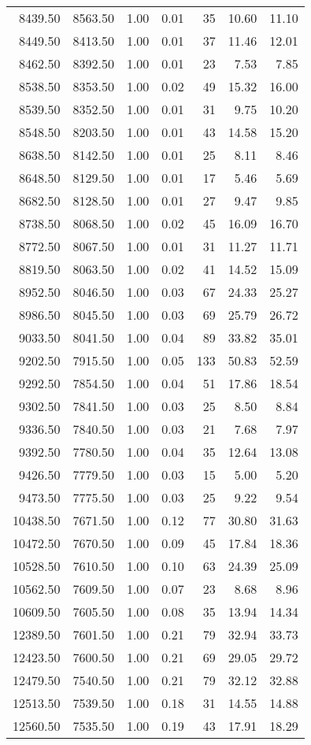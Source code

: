\begin{table}
\begin{tabular}{rrrrrrr}
8439.50 & 8563.50 & 1.00 & 0.01 & 35 & 10.60 & 11.10 \\
8449.50 & 8413.50 & 1.00 & 0.01 & 37 & 11.46 & 12.01 \\
8462.50 & 8392.50 & 1.00 & 0.01 & 23 & 7.53 & 7.85 \\
8538.50 & 8353.50 & 1.00 & 0.02 & 49 & 15.32 & 16.00 \\
8539.50 & 8352.50 & 1.00 & 0.01 & 31 & 9.75 & 10.20 \\
8548.50 & 8203.50 & 1.00 & 0.01 & 43 & 14.58 & 15.20 \\
8638.50 & 8142.50 & 1.00 & 0.01 & 25 & 8.11 & 8.46 \\
8648.50 & 8129.50 & 1.00 & 0.01 & 17 & 5.46 & 5.69 \\
8682.50 & 8128.50 & 1.00 & 0.01 & 27 & 9.47 & 9.85 \\
8738.50 & 8068.50 & 1.00 & 0.02 & 45 & 16.09 & 16.70 \\
8772.50 & 8067.50 & 1.00 & 0.01 & 31 & 11.27 & 11.71 \\
8819.50 & 8063.50 & 1.00 & 0.02 & 41 & 14.52 & 15.09 \\
8952.50 & 8046.50 & 1.00 & 0.03 & 67 & 24.33 & 25.27 \\
8986.50 & 8045.50 & 1.00 & 0.03 & 69 & 25.79 & 26.72 \\
9033.50 & 8041.50 & 1.00 & 0.04 & 89 & 33.82 & 35.01 \\
9202.50 & 7915.50 & 1.00 & 0.05 & 133 & 50.83 & 52.59 \\
9292.50 & 7854.50 & 1.00 & 0.04 & 51 & 17.86 & 18.54 \\
9302.50 & 7841.50 & 1.00 & 0.03 & 25 & 8.50 & 8.84 \\
9336.50 & 7840.50 & 1.00 & 0.03 & 21 & 7.68 & 7.97 \\
9392.50 & 7780.50 & 1.00 & 0.04 & 35 & 12.64 & 13.08 \\
9426.50 & 7779.50 & 1.00 & 0.03 & 15 & 5.00 & 5.20 \\
9473.50 & 7775.50 & 1.00 & 0.03 & 25 & 9.22 & 9.54 \\
10438.50 & 7671.50 & 1.00 & 0.12 & 77 & 30.80 & 31.63 \\
10472.50 & 7670.50 & 1.00 & 0.09 & 45 & 17.84 & 18.36 \\
10528.50 & 7610.50 & 1.00 & 0.10 & 63 & 24.39 & 25.09 \\
10562.50 & 7609.50 & 1.00 & 0.07 & 23 & 8.68 & 8.96 \\
10609.50 & 7605.50 & 1.00 & 0.08 & 35 & 13.94 & 14.34 \\
12389.50 & 7601.50 & 1.00 & 0.21 & 79 & 32.94 & 33.73 \\
12423.50 & 7600.50 & 1.00 & 0.21 & 69 & 29.05 & 29.72 \\
12479.50 & 7540.50 & 1.00 & 0.21 & 79 & 32.12 & 32.88 \\
12513.50 & 7539.50 & 1.00 & 0.18 & 31 & 14.55 & 14.88 \\
12560.50 & 7535.50 & 1.00 & 0.19 & 43 & 17.91 & 18.29 \\
\bottomrule
\end{tabular}
\end{table}
